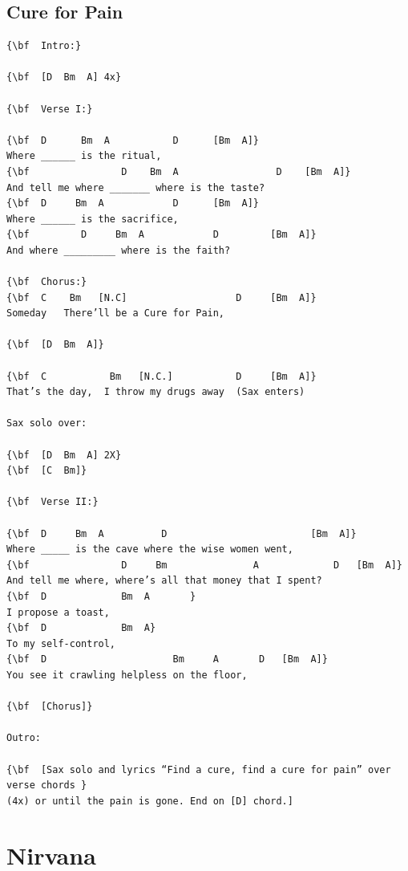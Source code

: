 \documentclass[a4paper]{article}
\begin{document}
\subsection{Cure for Pain}
\begin{Verbatim}[commandchars=\\\{\}]
{\bf  Intro:}

{\bf  [D  Bm  A] 4x}

{\bf  Verse I:}

{\bf  D      Bm  A           D      [Bm  A]}
Where ______ is the ritual,
{\bf                D    Bm  A                 D    [Bm  A]}
And tell me where _______ where is the taste?
{\bf  D     Bm  A            D      [Bm  A]}
Where ______ is the sacrifice,
{\bf         D     Bm  A            D         [Bm  A]}
And where _________ where is the faith?

{\bf  Chorus:}
{\bf  C    Bm   [N.C]                   D     [Bm  A]}
Someday   There’ll be a Cure for Pain,

{\bf  [D  Bm  A]}

{\bf  C           Bm   [N.C.]           D     [Bm  A]}
That’s the day,  I throw my drugs away  (Sax enters)

Sax solo over:

{\bf  [D  Bm  A] 2X}
{\bf  [C  Bm]}

{\bf  Verse II:}

{\bf  D     Bm  A          D                         [Bm  A]}
Where _____ is the cave where the wise women went,
{\bf                D     Bm               A             D   [Bm  A]}
And tell me where, where’s all that money that I spent?
{\bf  D             Bm  A       }
I propose a toast,
{\bf  D             Bm  A}
To my self-control,
{\bf  D                      Bm     A       D   [Bm  A]}
You see it crawling helpless on the floor,

{\bf  [Chorus]}

Outro:

{\bf  [Sax solo and lyrics “Find a cure, find a cure for pain” over verse chords }
(4x) or until the pain is gone. End on [D] chord.]

\end{Verbatim}
\newpage
\section{Nirvana}
\end{document}
